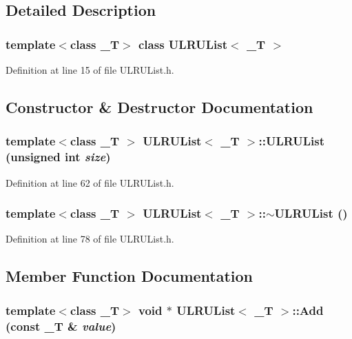 \subsection{Detailed Description}
\subsubsection*{template$<$class \_\-T$>$ class ULRUList$<$ \_\-T $>$}



Definition at line 15 of file ULRUList.h.

\subsection{Constructor \& Destructor Documentation}
\hypertarget{class_u_l_r_u_list_60617daad530159dfed2bbcdb494897f}{
\subsubsection[{ULRUList}]{\setlength{\rightskip}{0pt plus 5cm}template$<$class \_\-T $>$ {\bf ULRUList}$<$ \_\-T $>$::{\bf ULRUList} (unsigned int {\em size})}}
\label{class_u_l_r_u_list_60617daad530159dfed2bbcdb494897f}




Definition at line 62 of file ULRUList.h.\hypertarget{class_u_l_r_u_list_5c563d56e84b57d8f29d48ef9df2260e}{
\subsubsection[{$\sim$ULRUList}]{\setlength{\rightskip}{0pt plus 5cm}template$<$class \_\-T $>$ {\bf ULRUList}$<$ \_\-T $>$::$\sim${\bf ULRUList} ()}}
\label{class_u_l_r_u_list_5c563d56e84b57d8f29d48ef9df2260e}




Definition at line 78 of file ULRUList.h.

\subsection{Member Function Documentation}
\hypertarget{class_u_l_r_u_list_10c9b1c206a3dc2acf5e688ac21fa97a}{
\subsubsection[{Add}]{\setlength{\rightskip}{0pt plus 5cm}template$<$class \_\-T$>$ void $\ast$ {\bf ULRUList}$<$ \_\-T $>$::Add (const \_\-T \& {\em value})}}
\label{class_u_l_r_u_list_10c9b1c206a3dc2acf5e688ac21fa97a}





